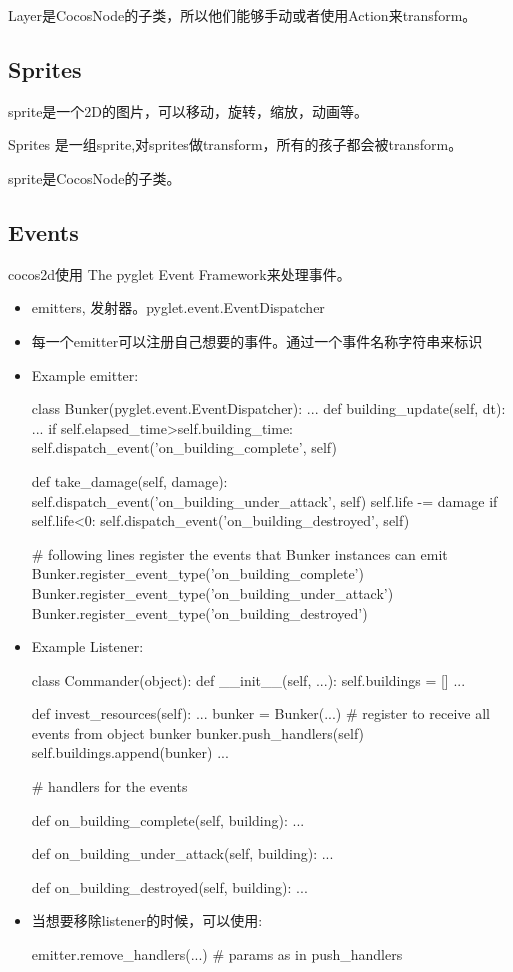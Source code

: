 Layer是CocosNode的子类，所以他们能够手动或者使用Action来transform。

\subsection{Sprites}
sprite是一个2D的图片，可以移动，旋转，缩放，动画等。

Sprites 是一组sprite,对sprites做transform，所有的孩子都会被transform。

sprite是CocosNode的子类。

\subsection{Events}
cocos2d使用  The pyglet Event Framework来处理事件。

\begin{itemize}
\item emitters, 发射器。pyglet.event.EventDispatcher
\item 每一个emitter可以注册自己想要的事件。通过一个事件名称字符串来标识
\item Example emitter:
\begin{Python}
class Bunker(pyglet.event.EventDispatcher):
    ...
    def building_update(self, dt):
        ...
    if self.elapsed_time>self.building_time:
        self.dispatch_event('on_building_complete', self)

def take_damage(self, damage):
    self.dispatch_event('on_building_under_attack', self)
    self.life -= damage
    if self.life<0:
        self.dispatch_event('on_building_destroyed', self)

# following lines register the events that Bunker instances can emit
Bunker.register_event_type('on_building_complete')
Bunker.register_event_type('on_building_under_attack')
Bunker.register_event_type('on_building_destroyed')
\end{Python}
\item Example Listener:
\begin{Python}
class Commander(object):
    def __init__(self, ...):
        self.buildings = []
        ...

    def invest_resources(self):
        ...
        bunker = Bunker(...)
        # register to receive all events from object bunker
        bunker.push_handlers(self)
        self.buildings.append(bunker)
        ...

    # handlers for the events

    def on_building_complete(self, building):
        ...

    def on_building_under_attack(self, building):
        ...

    def on_building_destroyed(self, building):
        ...
\end{Python}
\item 当想要移除listener的时候，可以使用:
\begin{Python}
emitter.remove_handlers(...) # params as in push_handlers
\end{Python}
\end{itemize}
